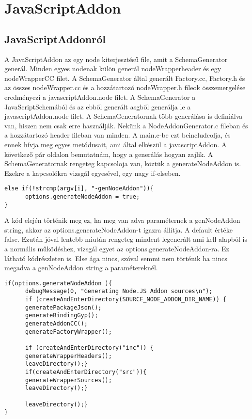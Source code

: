 \chapter{JavaScriptAddon}\label{chap:JavaScriptAddon}

\section{JavaScriptAddonról}

\noindent

A JavaScriptAddon az egy node kiterjesztésű file, amit a SchemaGenerator generál. Minden egyes nodenak külön generál nodeWrapperheader és egy nodeWrapperCC filet.
A SchemaGenerator által generált Factory.cc, Factory.h és az összes nodeWrapper.cc és a hozzátartozó nodeWrapper.h fileok összemergelése eredményezi a javascriptAddon.node filet.
A SchemaGenerator a JavaScriptSchemából és az ebből generált asgből generálja le a javascriptAddon.node filet.
A SchemaGeneratornak több generálása is definiálva van, hiszen nem csak erre használják. Nekünk a NodeAddonGenerator.c fileban és a hozzátartozó header fileban van minden.
A main.c-be ezt beincludeolja, és ennek hívja meg egyes metódusait, ami által elkészül a javascriptAddon.
A következő pár oldalon bemutatnám, hogy a generálás hogyan zajlik.
A SchemaGeneratornak rengeteg kapcsoloja van, köztük a generateNodeAddon is. Ezekre a kapcsolókra vizsgál egyesével, egy nagy if-elseben.
\begin{lstlisting}[caption={SchemaGenerator kapcsoló vizsgálás},label={lst:schemagenerator_argv_genNodeAddon}, language={CStyle}]
else if(!strcmp(argv[i], "-genNodeAddon")){
      options.generateNodeAddon = true;
}
\end{lstlisting}
A kód elején történik meg ez, ha meg van adva paraméternek a genNodeAddon string, akkor az options.generateNodeAddon-t igazra állítja. A default értéke false.
Ezután jóval lentebb miután rengeteg mindent legenerált ami kell alapból is a normális működéshez, vizsgál egyet az options.generateNodeAddon-ra.
Ez látható  kódrészleten is. Else ága nincs, szóval semmi nem történik ha nincs megadva a genNodeAddon string a paramétereknél.
\begin{lstlisting}[caption={SchemaGenerator javascriptAddon generálás},label={lst:schemagenerator_genNodeAddon_check}, language={CStyle}]
if(options.generateNodeAddon ){
      debugMessage(0, "Generating Node.JS Addon sources\n");
      if (createAndEnterDirectory(SOURCE_NODE_ADDON_DIR_NAME)) {
      generatePackageJson();
      generateBindingGyp();
      generateAddonCC();
      generateFactoryWrapper();

      if (createAndEnterDirectory("inc")) {
      generateWrapperHeaders();
      leaveDirectory();}
      if(createAndEnterDirectory("src")){
      generateWrapperSources();
      leaveDirectory();}

      leaveDirectory();}
}
\end{lstlisting}

